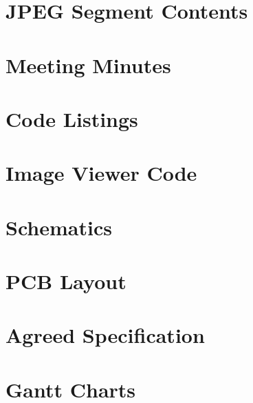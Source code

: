 \documentclass[oneside]{ecsgdp}         %
\begin{document}







\newpage





\newpage

\appendix
\chapter{JPEG Segment Contents}
\label{chap:jpeg-segment-contents}

\chapter{Meeting Minutes}
\label{chap:meeting_minutes}

\newpage
\chapter{Code Listings}
\label{chap:Matlab_code}

\newpage
\chapter{Image Viewer Code}

\newpage

\newpage

\newpage
\chapter{Schematics}

\newpage

\chapter{PCB Layout}

\newpage

\chapter{Agreed Specification}

\newpage

\chapter{Gantt Charts}

\newpage

\backmatter



\end{document}
